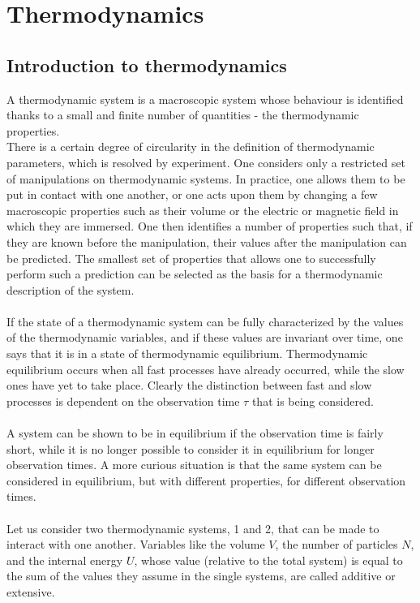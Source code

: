 \chapter{Thermodynamics}
\section{Introduction to thermodynamics}
A thermodynamic system is a macroscopic system whose behaviour is identified thanks to a small and finite number of quantities - the thermodynamic properties.
\\
There is a certain degree of circularity in the definition of thermodynamic parameters, which is resolved by experiment. One considers only a restricted set of manipulations on thermodynamic systems. In practice, one allows them to be put in contact with one another, or one acts upon them by changing a few macroscopic properties such as their volume or the electric or magnetic field in which they are immersed. One then identifies a number of properties such that, if they are known before the manipulation, their values after the manipulation can be predicted. The smallest set of properties that allows one to successfully perform such a prediction can be selected as the basis for a thermodynamic description of the system.
\\ \\
If the state of a thermodynamic system can be fully characterized by the values of the thermodynamic variables, and if these values are invariant over time, one says that it is in a state of thermodynamic equilibrium. Thermodynamic equilibrium occurs when all fast processes have already occurred, while the slow ones have yet to take place. Clearly the distinction between fast and slow processes is dependent on the observation time $\tau$ that is being considered.
\\ \\
A system can be shown to be in equilibrium if the observation time is fairly short, while it is no longer possible to consider it in equilibrium for longer observation times. A more curious situation is that the same system can be considered in equilibrium, but with different properties, for different observation times.
\\ \\
Let us consider two thermodynamic systems, 1 and 2, that can be made to interact with one another. Variables like the volume $V$, the number of particles $N$, and the internal energy $U$, whose value (relative to the total system) is equal to the sum of the values they assume in the single systems, are called additive or extensive.
